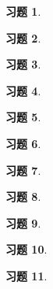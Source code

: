 \documentclass{ctexart}
\newtheorem{problem}{习题}[section]
\begin{document}
\begin{problem}\



\end{problem}

\begin{problem}\



\end{problem}

\begin{problem}\



\end{problem}

\begin{problem}\



\end{problem}

\setcounter{problem}{13}
\begin{problem}\



\end{problem}

\begin{problem}\



\end{problem}

\setcounter{problem}{20}
\begin{problem}\



\end{problem}

\begin{problem}\



\end{problem}

\setcounter{problem}{25}
\begin{problem}\



\end{problem}

\setcounter{problem}{27}
\begin{problem}\



\end{problem}

\begin{problem}\



\end{problem}
\end{document}
